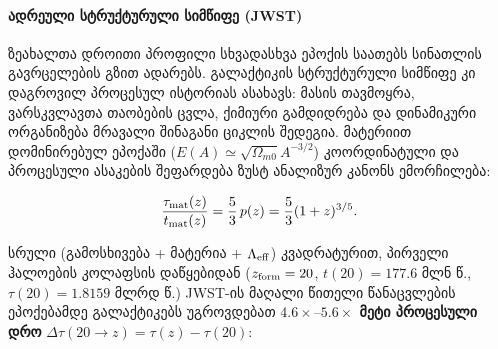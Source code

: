 \documentclass[11pt,a4paper]{article}
\begin{document}
\paragraph{ადრეული სტრუქტურული სიმწიფე (JWST)}

ზეახალთა დროითი პროფილი სხვადასხვა ეპოქის საათებს სინათლის გავრცელების გზით ადარებს. გალაქტიკის სტრუქტურული სიმწიფე კი დაგროვილ პროცესულ ისტორიას ასახავს: მასის თავმოყრა, ვარსკვლავთა თაობების ცვლა, ქიმიური გამდიდრება და დინამიკური ორგანიზება მრავალი შინაგანი ციკლის შედეგია. მატერიით დომინირებულ ეპოქაში ($E(A) \simeq \sqrt{\Omega_{m0}}A^{-3/2}$) კოორდინატული და პროცესული ასაკების შეფარდება ზუსტ ანალიზურ კანონს ემორჩილება:

\[
\frac{\tau_{\rm mat}(z)}{t_{\rm mat}(z)} = \frac{5}{3}\,p(z) = \frac{5}{3}(1+z)^{3/5}.
\]

სრული (გამოსხივება + მატერია + $\Lambda_{\rm eff}$) კვადრატურით, პირველი ჰალოების კოლაფსის დაწყებიდან ($z_{\rm form} = 20$, $t(20) = 177.6\text{ მლნ წ.}$, $\tau(20) = 1.8159\text{ მლრდ წ.}$) JWST-ის მაღალი წითელი წანაცვლების ეპოქებამდე გალაქტიკებს უგროვდებათ \textbf{$4.6\times\text{–}5.6\times$ მეტი პროცესული დრო} $\Delta\tau(20\to z) = \tau(z) - \tau(20)$:
\end{document}
